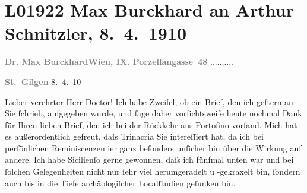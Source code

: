 

\section[Max Burckhard an Arthur Schnitzler, 8. 4. 1910]{L01922 Max Burckhard an Arthur Schnitzler, 8. 4. 1910}
\nopagebreak{}
\rehead{ }\normalsize\beginnumbering{}
\toendnotes[C]{\smallbreak\pagebreak[2]}
\toendnotes[C]{\smallbreak}
\pstart
           {\pb}\textcolor{gray}{\textbf{Dr. Max Burckhard}}\hfill \textcolor{gray}{\textbf{Wien, IX. Porzellangasse 48}}{ }..........\pend
           
\pstart
           \raggedleft{}\textcolor{gray}{\textbf{St. Gilgen}}{ }8. 4. 10\pend
           
\pstart{}Lieber verehrter Herr Doctor!\pend\vspace{0.5em}
\pstart
           Ich habe Zweifel, ob ein Brief, den ich geſtern an Sie{ }ſchrieb, aufgegeben wurde, und{ }ſage daher vorſichtsweiſe heute nochmal Dank für Ihren lieben Brief, den ich bei der
               Rückkehr aus Portofino vorfand. Mich hat es
               außerordentlich gefreut, daſs Trinacria Sie
               intereſſiert hat, da ich bei perſönlichen Reminiscenzen i{\geminationm}er ganz beſonders unſicher bin über die Wirkung auf andere. Ich habe Sicilienſo gerne gewonnen, daſs ich fünfmal unten war und
               bei{ }ſolchen Gelegenheiten nicht nur{ }ſehr viel herumgeradelt u -gekraxelt bin,{ }ſondern
               auch bis in die Tiefe archäologiſcher Localſtudien geſunken bin.\pend
           
